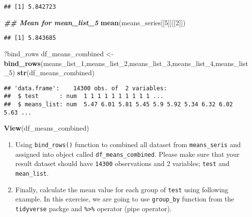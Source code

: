 \documentclass[
]{article}
\newenvironment{Shaded}{\begin{snugshade}}{\end{snugshade}}
\newcommand{\DecValTok}[1]{\textcolor[rgb]{0.00,0.00,0.81}{#1}}
\newcommand{\DocumentationTok}[1]{\textcolor[rgb]{0.56,0.35,0.01}{\textbf{\textit{#1}}}}
\newcommand{\FunctionTok}[1]{\textcolor[rgb]{0.13,0.29,0.53}{\textbf{#1}}}
\newcommand{\NormalTok}[1]{#1}
\newcommand{\OtherTok}[1]{\textcolor[rgb]{0.56,0.35,0.01}{#1}}
\begin{document}
\begin{verbatim}
## [1] 5.842723
\end{verbatim}

\begin{Shaded}
\begin{Highlighting}[]
\DocumentationTok{\#\# Mean for mean\_list\_5}
\FunctionTok{mean}\NormalTok{(means\_series[[}\DecValTok{5}\NormalTok{]][[}\DecValTok{2}\NormalTok{]])}
\end{Highlighting}
\end{Shaded}

\begin{verbatim}
## [1] 5.843685
\end{verbatim}

\begin{Shaded}
\begin{Highlighting}[]
\NormalTok{?bind\_rows}
\NormalTok{df\_means\_combined }\OtherTok{\textless{}{-}} \FunctionTok{bind\_rows}\NormalTok{(means\_list\_1,means\_list\_2,means\_list\_3,means\_list\_4,means\_list\_5)}
\FunctionTok{str}\NormalTok{(df\_means\_combined)}
\end{Highlighting}
\end{Shaded}

\begin{verbatim}
## 'data.frame':    14300 obs. of  2 variables:
##  $ test      : num  1 1 1 1 1 1 1 1 1 1 ...
##  $ means_list: num  5.47 6.01 5.81 5.45 5.9 5.92 5.34 6.32 6.02 5.63 ...
\end{verbatim}

\begin{Shaded}
\begin{Highlighting}[]
\FunctionTok{View}\NormalTok{(df\_means\_combined)}
\end{Highlighting}
\end{Shaded}

\begin{enumerate}
\def\labelenumi{\arabic{enumi}.}
\setcounter{enumi}{1}
\item
  Using \texttt{bind\_rows()} function to combined all dataset from
  \texttt{means\_seris} and assigned into object called
  \texttt{df\_means\_combined}. Please make sure that your result
  dataset should have \texttt{14300} observations and 2 variables;
  \texttt{test} and \texttt{mean\_list}.
\item
  Finally, calculate the mean value for each group of \texttt{test}
  using following example. In this exercise, we are going to use
  \texttt{group\_by} function from the \texttt{tidyverse} packge and
  \texttt{\%\textgreater{}\%} operator (pipe operator).
\end{enumerate}
\end{document}
